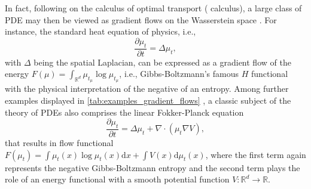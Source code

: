 \begin{table}[t]
\caption{Equivalence between gradient flows and PDEs where the gradient flow of flow functional $F(\mu_t)$ in Wasserstein space satisfies the corresponding PDE. The function $f : \mathbb{R} \rightarrow \mathbb{R}$ is convex and superlinear and $V, W : \gX \rightarrow \mathbb{R}$ are convex and sufficiently smooth.}
\label{tab:examples_gradient_flows}
\centering
{}
\end{table}

In fact, following \citet{otto2001geometry} on the calculus of optimal transport (\citeauthor{otto2001geometry} calculus), a large class of \acrlong{PDE} may then be viewed as gradient flows on the Wasserstein space \citep{jordan1998variational}.
For instance, the standard heat equation of physics, i.e.,
\begin{equation*}
	\frac{\partial \mu_t}{\partial t} = \Delta \mu_t,
\end{equation*}
with $\Delta$ being the spatial Laplacian, can be expressed as a gradient flow of the energy $F(\mu) = \int_{\mathbb{R}^d} \mu_t_\mu \log \mu_t_\mu$, i.e., Gibbs-Boltzmann's famous $H$ functional with the physical interpretation of the negative of an entropy.
Among further examples displayed in \cref{tab:examples_gradient_flows} \citep{alvarez2021optimizing, villani2021topics}, a classic subject of the theory of PDEs also comprises the linear Fokker-Planck equation
\begin{equation}
	\label{eq:linear_fokker_planck}
	\frac{\partial \mu_t}{\partial t} = \Delta \mu_t+\nabla \cdot(\mu_t \nabla V),
\end{equation}
that results in flow functional $F(\mu_t) = \int \mu_t(x) \log \mu_t(x) \mathrm{d} x+\int V(x) \mathrm{d} \mu_t(x)$, where the first term again represents the negative Gibbs-Boltzmann entropy and the second term plays the role of an energy functional with a smooth potential function $V : \mathbb{R}^d \rightarrow \mathbb{R}$.

